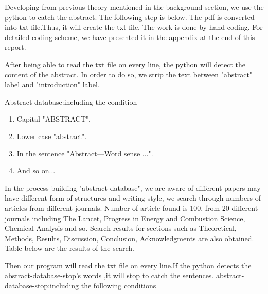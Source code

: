 	Developing from previous theory mentioned in the background section, we use the python to catch the abstract.
	The following step is below.
	The pdf is converted into txt file.Thus, it will create the txt file.
	The work is done by hand coding.
	For detailed coding scheme, we have presented it in the appendix at the end of this report.
	 
	After being able to read the txt file on every line, the python will detect the content of the abstract.
	In order to do so, we strip the text between "abstract" label and "introduction" label.	
	
	Abstract-database:including the condition
	
	\begin{enumerate}
		
		\item Capital         "ABSTRACT".
		\item Lower case      "abstract".
		\item In the sentence "Abstract—Word sense ...".
		\item And so on...
		
	\end{enumerate}
	
	In the process building "abstract database", we are aware of different papers may have different form of structures and writing style, we search through numbers of articles from different journals.
	Number of article found is 100, from 20 different journals including The Lancet, Progress in Energy and Combustion Science, Chemical Analysis and so.
	Search results for sections such as Theoretical, Methods, Results, Discussion, Conclusion, Acknowledgments are also obtained.
	Table below are the results of the search.
	
	
	Then our program will read the txt file on every line.If the python detects the abstract-database-stop's words ,it will stop to catch the sentences.
	abstract-database-stop:including the following conditions
	
